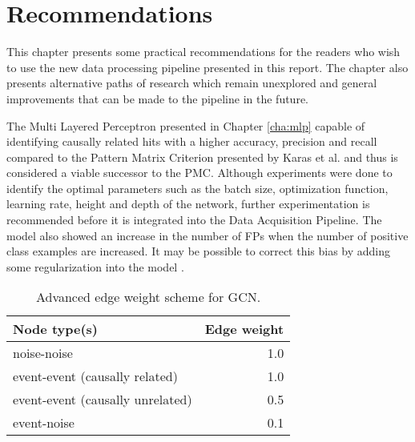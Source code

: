 
\chapter{Recommendations} %
\label{cha:rec}

%

This chapter presents some practical recommendations for the readers
who wish to use the new data processing pipeline presented in this
report. The chapter also presents alternative paths of research which
remain unexplored and general improvements that can be made to the
pipeline in the future.

The Multi Layered Perceptron presented in Chapter \ref{cha:mlp}
capable of identifying causally related hits with a higher accuracy,
precision and recall compared to the Pattern Matrix Criterion
presented by Karas et al. and thus is considered a viable successor to
the PMC. Although experiments were done to identify the optimal
parameters such as the batch size, optimization function, learning
rate, height and depth of the network, further experimentation is
recommended before it is integrated into the Data Acquisition
Pipeline. The model also showed an increase in the number of FPs when
the number of positive class examples are increased. It may be
possible to correct this bias by adding some regularization into the
model \cite{Goodfellow-et-al-2016}.

\begin{table}[htb]
  \centering
  \caption{Advanced edge weight scheme for GCN.}
  \begin{tabular}{lr}
    \hline
    Node type(s) & Edge weight \\
    \hline
    noise-noise & 1.0 \\
    event-event (causally related) & 1.0 \\
    event-event (causally unrelated) & 0.5 \\
    event-noise & 0.1 \\
    \hline
  \end{tabular}
  \label{tab:gcn-adv-weights}
\end{table}


